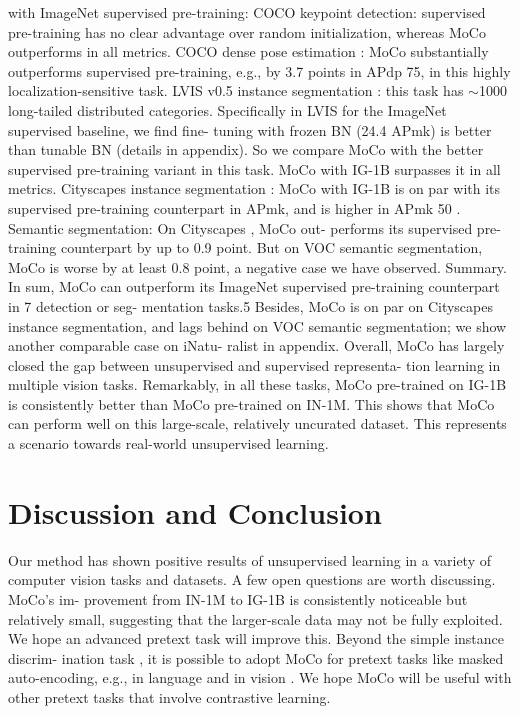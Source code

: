 \documentclass[10pt,twocolumn]{article}  %
\begin{document}
with ImageNet supervised pre-training:
COCO keypoint detection: supervised pre-training has
no clear advantage over random initialization, whereas
MoCo outperforms in all metrics.
COCO dense pose estimation \cite{1_guler2018densepose}: MoCo substantially
outperforms supervised pre-training, e.g., by 3.7 points in
APdp
75, in this highly localization-sensitive task.
LVIS v0.5 instance segmentation \cite{27_gupta2019lvis}: this task has
$\sim $1000 long-tailed distributed categories. Speciﬁcally in
LVIS for the ImageNet supervised baseline, we ﬁnd ﬁne-
tuning with frozen BN (24.4 APmk) is better than tunable
BN (details in appendix). So we compare MoCo with the
better supervised pre-training variant in this task. MoCo
with IG-1B surpasses it in all metrics.
Cityscapes instance segmentation \cite{10_cordts2016cityscapes}: MoCo with IG-1B
is on par with its supervised pre-training counterpart in
APmk, and is higher in APmk
50 .
Semantic segmentation: On Cityscapes \cite{10_cordts2016cityscapes}, MoCo out-
performs its supervised pre-training counterpart by up to 0.9
point. But on VOC semantic segmentation, MoCo is worse
by at least 0.8 point, a negative case we have observed.
Summary. In sum, MoCo can outperform its ImageNet
supervised pre-training counterpart in 7 detection or seg-
mentation tasks.5 Besides, MoCo is on par on Cityscapes
instance segmentation, and lags behind on VOC semantic
segmentation; we show another comparable case on iNatu-
ralist \cite{57_vanhorn2018inaturalist} in appendix. Overall, MoCo has largely closed
the gap between unsupervised and supervised representa-
tion learning in multiple vision tasks.
Remarkably, in all these tasks, MoCo pre-trained on
IG-1B is consistently better than MoCo pre-trained on
IN-1M. This shows that MoCo can perform well on this
large-scale, relatively uncurated dataset. This represents a
scenario towards real-world unsupervised learning.

\section{Discussion and Conclusion}
Our method has shown positive results of unsupervised
learning in a variety of computer vision tasks and datasets.
A few open questions are worth discussing. MoCo's im-
provement from IN-1M to IG-1B is consistently noticeable
but relatively small, suggesting that the larger-scale data
may not be fully exploited. We hope an advanced pretext
task will improve this. Beyond the simple instance discrim-
ination task \cite{61_wu2018unsupervised}, it is possible to adopt MoCo for pretext
tasks like masked auto-encoding, e.g., in language \cite{12_devlin2019bert} and
in vision \cite{46_oord2018representation}. We hope MoCo will be useful with other
pretext tasks that involve contrastive learning.



\end{document}
